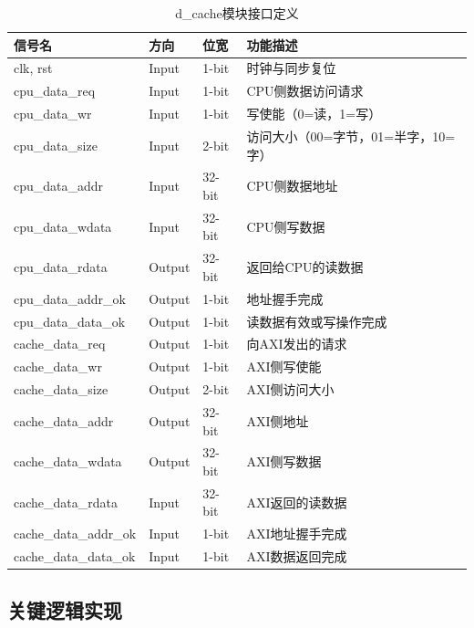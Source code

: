\begin{table}[htp]
\caption{d\_cache模块接口定义}
\begin{center}
\begin{tabular}{|l|l|l|p{5.5cm}|}
\hline
\textbf{信号名} & \textbf{方向} & \textbf{位宽} & \textbf{功能描述} \\ \hline\hline
clk, rst              & Input  & 1-bit  & 时钟与同步复位 \\ \hline
cpu\_data\_req        & Input  & 1-bit  & CPU侧数据访问请求 \\ \hline
cpu\_data\_wr         & Input  & 1-bit  & 写使能（0=读，1=写）\\ \hline
cpu\_data\_size       & Input  & 2-bit  & 访问大小（00=字节，01=半字，10=字）\\ \hline
cpu\_data\_addr       & Input  & 32-bit & CPU侧数据地址 \\ \hline
cpu\_data\_wdata      & Input  & 32-bit & CPU侧写数据 \\ \hline
cpu\_data\_rdata      & Output & 32-bit & 返回给CPU的读数据 \\ \hline
cpu\_data\_addr\_ok   & Output & 1-bit  & 地址握手完成 \\ \hline
cpu\_data\_data\_ok   & Output & 1-bit  & 读数据有效或写操作完成 \\ \hline
cache\_data\_req      & Output & 1-bit  & 向AXI发出的请求 \\ \hline
cache\_data\_wr       & Output & 1-bit  & AXI侧写使能 \\ \hline
cache\_data\_size     & Output & 2-bit  & AXI侧访问大小 \\ \hline
cache\_data\_addr     & Output & 32-bit & AXI侧地址 \\ \hline
cache\_data\_wdata    & Output & 32-bit & AXI侧写数据 \\ \hline
cache\_data\_rdata    & Input  & 32-bit & AXI返回的读数据 \\ \hline
cache\_data\_addr\_ok & Input  & 1-bit  & AXI地址握手完成 \\ \hline
cache\_data\_data\_ok & Input  & 1-bit  & AXI数据返回完成 \\ \hline
\end{tabular}
\end{center}
\end{table}

\subsection{关键逻辑实现}


